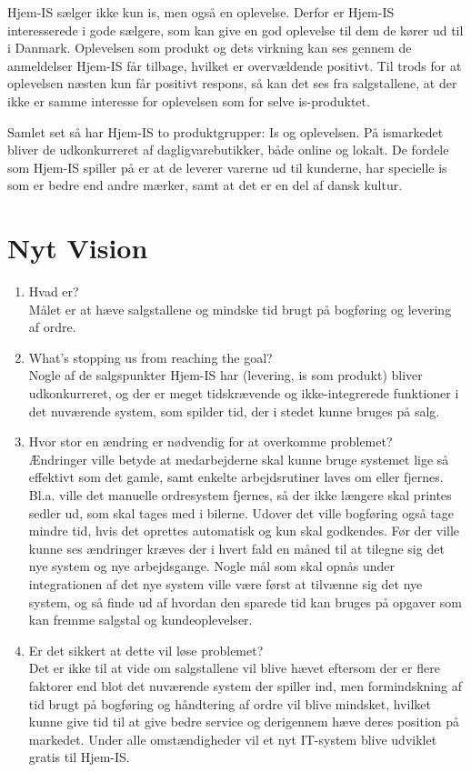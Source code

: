 Hjem-IS sælger ikke kun is, men også en oplevelse. Derfor er Hjem-IS interesserede i gode sælgere, som kan give en god oplevelse til dem de kører ud til i Danmark. Oplevelsen som produkt og dets virkning kan ses gennem de anmeldelser Hjem-IS får tilbage, hvilket er overvældende positivt. Til trods for at oplevelsen næsten kun får positivt respons, så kan det ses fra salgstallene, at der ikke er samme interesse for oplevelsen som for selve is-produktet. 

Samlet set så har Hjem-IS to produktgrupper: Is og oplevelsen. På ismarkedet bliver de udkonkurreret af dagligvarebutikker, både online og lokalt. De fordele som Hjem-IS spiller på er at de leverer varerne ud til kunderne, har specielle is som er bedre end andre mærker, samt at det er en del af dansk kultur.

\section{Nyt Vision}
\begin{enumerate}
    \item Hvad er? \\
    Målet er at hæve salgstallene og mindske tid brugt på bogføring og levering af ordre.
    \item What’s stopping us from reaching the goal? \\
    Nogle af de salgspunkter Hjem-IS har (levering, is som produkt) bliver udkonkurreret, og der er meget tidskrævende og ikke-integrerede funktioner i det nuværende system, som spilder tid, der i stedet kunne bruges på salg.
    \item Hvor stor en ændring er nødvendig for at overkomme problemet? \\
    Ændringer ville betyde at medarbejderne skal kunne bruge systemet lige så effektivt som det gamle, samt enkelte arbejdsrutiner laves om eller fjernes. Bl.a. ville det manuelle ordresystem fjernes, så der ikke længere skal printes sedler ud, som skal tages med i bilerne. Udover det ville bogføring også tage mindre tid, hvis det oprettes automatisk og kun skal godkendes. Før der ville kunne ses ændringer kræves der i hvert fald en måned til at tilegne sig det nye system og nye arbejdsgange. Nogle mål som skal opnås under integrationen af det nye system ville være først at tilvænne sig det nye system, og så finde ud af hvordan den sparede tid kan bruges på opgaver som kan fremme salgstal og kundeoplevelser.
    \item Er det sikkert at dette vil løse problemet? \\
    Det er ikke til at vide om salgstallene vil blive hævet eftersom der er flere faktorer end blot det nuværende system der spiller ind, men formindskning af tid brugt på bogføring og håndtering af ordre vil blive mindsket, hvilket kunne give tid til at give bedre service og derigennem hæve deres position på markedet. Under alle omstændigheder vil et nyt IT-system blive udviklet gratis til Hjem-IS.    
\end{enumerate}

